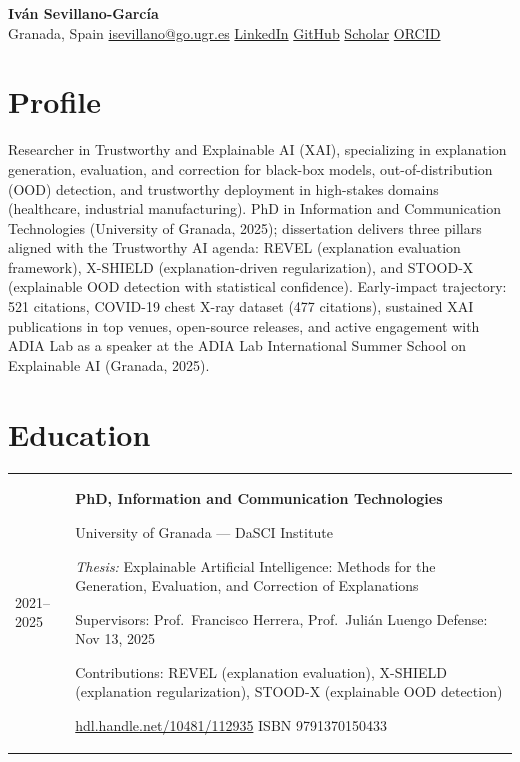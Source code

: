 \documentclass[11pt,a4paper]{article}
\makeatletter
\newcommand{\entry}[2]{%
  \noindent
  \begin{tabularx}{\textwidth}{@{}p{0.18\textwidth}@{\hspace{0.02\textwidth}}X@{}}
    #1 & #2
  \end{tabularx}
  \par\vspace{0.15em}
}
\newcommand{\subt}[1]{{\color{subtitle}\small #1}\par}
\makeatother
\begin{document}
\begin{center}
{\huge \textbf{Iván Sevillano-García}} \\[0.3em]
\small
Granada, Spain \quad\textbar\quad
\href{mailto:isevillano@go.ugr.es}{isevillano@go.ugr.es} \quad\textbar\quad
\href{https://www.linkedin.com/in/iván-sevillano-garcía-304801116}{LinkedIn} \quad\textbar\quad
\href{https://github.com/isega24}{GitHub} \quad\textbar\quad
\href{https://scholar.google.com/citations?user=g5xyauEAAAAJ}{Scholar} \quad\textbar\quad
\href{https://orcid.org/0000-0002-5029-9106}{ORCID}
\end{center}

\vspace{0.3em}

\section*{Profile}

Researcher in Trustworthy and Explainable AI (XAI), specializing in explanation generation, evaluation, and correction for black-box models, out-of-distribution (OOD) detection, and trustworthy deployment in high-stakes domains (healthcare, industrial manufacturing). PhD in Information and Communication Technologies (University of Granada, 2025); dissertation delivers three pillars aligned with the Trustworthy AI agenda: REVEL (explanation evaluation framework), X-SHIELD (explanation-driven regularization), and STOOD-X (explainable OOD detection with statistical confidence). Early-impact trajectory: 521 citations, COVID-19 chest X-ray dataset (477 citations), sustained XAI publications in top venues, open-source releases, and active engagement with ADIA Lab as a speaker at the ADIA Lab International Summer School on Explainable AI (Granada, 2025).

\section*{Education}

\entry{2021--2025}{%
  \textbf{PhD, Information and Communication Technologies} \par
  \subt{University of Granada --- DaSCI Institute} \par
  \textit{Thesis:} Explainable Artificial Intelligence: Methods for the Generation, Evaluation, and Correction of Explanations \par
  \subt{Supervisors: Prof.~Francisco Herrera, Prof.~Julián Luengo \quad Defense: Nov 13, 2025} \par
  \subt{Contributions: REVEL (explanation evaluation), X-SHIELD (explanation regularization), STOOD-X (explainable OOD detection)} \par
  \subt{\href{https://hdl.handle.net/10481/112935}{hdl.handle.net/10481/112935} \quad ISBN 9791370150433}
}
\end{document}
